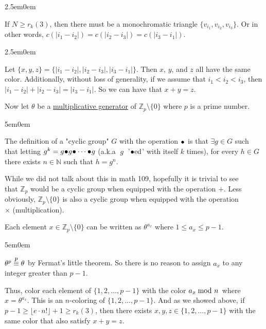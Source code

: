 \documentclass{book}
\newcommand{\hFour}{%
   \color{Cerulean}
   \fontsize{12}{14}\selectfont%
}
\newcommand{\myComment}{%
   \color{RawerSienna}%
   \fontsize{12}{14}\selectfont%
}
\newenvironment{myIndent}{%
   \begin{adjustwidth}{2.5em}{0em}%
}{%
   \end{adjustwidth}%
}
\newenvironment{myDindent}{%
   \begin{adjustwidth}{5em}{0em}%
}{%
   \end{adjustwidth}%
}
\newcommand{\udefine}[1]{{%
   \setulcolor{Red}%
   \setul{0.14em}{0.07em}%
   \ul{#1}%
}}
\newcommand{\myequiv}[1]{\stackrel{\mathclap{\mbox{\footnotesize{$#1$}}}}{\equiv}}
\newcommand{\filledcirc}[1][.]{\ensuremath{\hspace{0.05em}{\color{#1}\bullet}\mathllap{\circ}\hspace{0.05em}}}
\newcommand{\retTwo}{\hfill\bigbreak}
\begin{document}
{\begin{myIndent}
   \newpage

   If $N \geq r_k(3)$, then there must be a monochromatic triangle $\{v_{i_1}, v_{i_2}, v_{i_3}\}$. Or in\\ other words, $c(|i_1 - i_2|) = c(|i_2 - i_3|) = c(|i_3 - i_1|)$.\retTwo

   {\begin{myIndent} \hFour
      Let $\{x, y, z\} = \{|i_1 - i_2|, |i_2 - i_3|, |i_3 - i_1|\}$. Then $x$, $y$, and $z$ all have the same color. Additionally, without loss of generality, if we assume that $i_1 < i_2 < i_3$, then $|i_1 - i_2| + |i_2 - i_3| = |i_3 - i_1|$. So we can have that $x + y = z$.\retTwo
   \end{myIndent}}

   Now let $\theta$ be a \udefine{multiplicative generator} of $\mathbb{Z}_p \setminus \{0\}$ where $p$ is a prime number. \retTwo
   
   {\begin{myDindent} \myComment
      The definition of a "cyclic group" $G$ with the operation $\filledcirc$ is that $\exists g \in G$ such that letting $g^k = g \filledcirc g \filledcirc \cdots \filledcirc g$ (a.k.a $\phantom{|}g\phantom{|}$ '$\filledcirc\text{ed}$' with itself $k$ times), for every $h \in G$ there exists $n \in \mathbb{N}$ such that $h = g^n$. \retTwo

      While we did not talk about this in math 109, hopefully it is trivial to see\\ that $\mathbb{Z}_p$ would be a cyclic group when equipped with the operation $+$. Less obviously, $\mathbb{Z}_p \setminus \{0\}$ is also a cyclic group when equipped with the operation\\ ${\times}$ (multiplication).\retTwo


   \end{myDindent}}

   Each element $x \in \mathbb{Z}_p \setminus \{0\}$ can be written as $\theta^{a_x}$ where $1 \leq a_x \leq p - 1$.
   {\begin{myDindent} \myComment
      $\theta^p \myequiv{p} \theta$ by Fermat's little theorem. So there is no reason to assign $a_x$ to any integer greater than $p-1$.\retTwo
   \end{myDindent}}

   Thus, color each element of $\{1, 2, \ldots, p-1\}$ with the color $a_x {\hspace{-0.4em}\mod{n}}\hspace{0.1em}$ where\\ $x = \theta^{a_x}$. This is an $n$-coloring of $\{1, 2, \ldots, p-1\}$. And as we showed above, if $p - 1 \geq \lfloor e\cdot n! \rfloor + 1 \geq r_k(3)$, then there exists $x, y, z \in \{1, 2, \ldots, p-1\}$ with the same color that also satisfy $x + y = z$.\retTwo
   

\end{myIndent}}
\end{document}
